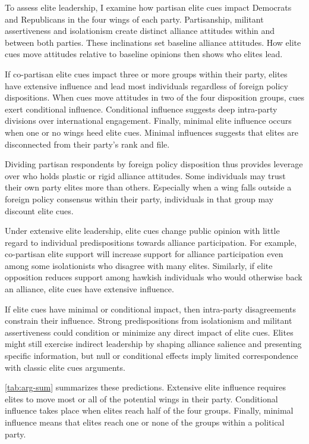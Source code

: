 \documentclass[12pt]{article}
\begin{document}
To assess elite leadership, I examine how partisan elite cues impact Democrats and Republicans in the four wings of each party.
Partisanship, militant assertiveness and isolationism create distinct alliance attitudes within and between both parties. 
These inclinations set baseline alliance attitudes. 
How elite cues move attitudes relative to baseline opinions then shows who elites lead. 


If co-partisan elite cues impact three or more groups within their party, elites have extensive influence and lead most individuals regardless of foreign policy dispositions. 
When cues move attitudes in two of the four disposition groups, cues exert conditional influence. 
Conditional influence suggests deep intra-party divisions over international engagement. 
Finally, minimal elite influence occurs when one or no wings heed elite cues.
Minimal influences suggests that elites are disconnected from their party's rank and file.


Dividing partisan respondents by foreign policy disposition thus provides leverage over who holds plastic or rigid alliance attitudes. 
Some individuals may trust their own party elites more than others. 
Especially when a wing falls outside a foreign policy consensus within their party, individuals in that group may discount elite cues.


Under extensive elite leadership, elite cues change public opinion with little regard to individual predispositions towards alliance participation. 
For example, co-partisan elite support will increase support for alliance participation even among some isolationists who disagree with many elites. 
Similarly, if elite opposition reduces support among hawkish individuals who would otherwise back an alliance, elite cues have extensive influence. 


If elite cues have minimal or conditional impact, then intra-party disagreements constrain their influence.
Strong predispositions from isolationism and militant assertiveness could condition or minimize any direct impact of elite cues.
Elites might still exercise indirect leadership by shaping alliance salience and presenting specific information, but null or conditional effects imply limited correspondence with classic elite cues arguments. 


\autoref{tab:arg-sum} summarizes these predictions. 
Extensive elite influence requires elites to move most or all of the potential wings in their party. 
Conditional influence takes place when elites reach half of the four groups. 
Finally, minimal influence means that elites reach one or none of the groups within a political party.
\end{document}
